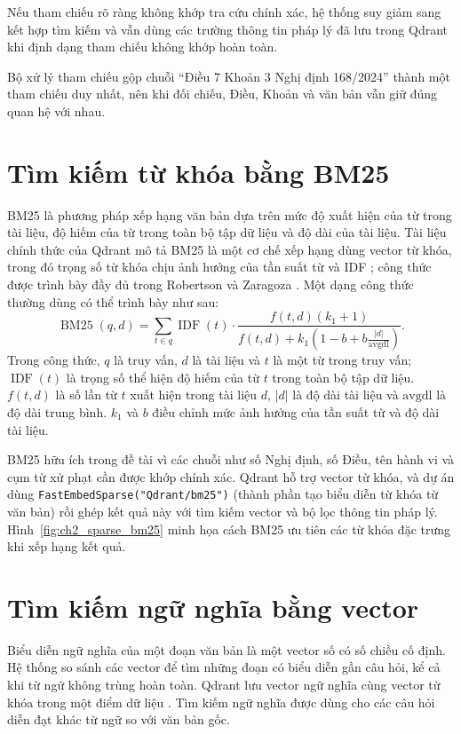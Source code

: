 \documentclass[12pt,a4paper,oneside]{report}
\begin{document}
Nếu tham chiếu rõ ràng không khớp tra cứu chính xác, hệ thống suy giảm sang kết hợp tìm kiếm và vẫn dùng các trường thông tin pháp lý đã lưu trong Qdrant khi định dạng tham chiếu không khớp hoàn toàn.

Bộ xử lý tham chiếu gộp chuỗi ``Điều 7 Khoản 3 Nghị định 168/2024'' thành một tham chiếu duy nhất, nên khi đối chiếu, Điều, Khoản và văn bản vẫn giữ đúng quan hệ với nhau.


\section{Tìm kiếm từ khóa bằng BM25}
BM25 là phương pháp xếp hạng văn bản dựa trên mức độ xuất hiện của từ trong tài liệu, độ hiếm của từ trong toàn bộ tập dữ liệu và độ dài của tài liệu. Tài liệu chính thức của Qdrant mô tả BM25 là một cơ chế xếp hạng dùng vector từ khóa, trong đó trọng số từ khóa chịu ảnh hưởng của tần suất từ và IDF \cite{qdrant_bm25_docs}; công thức được trình bày đầy đủ trong Robertson và Zaragoza \cite{bm25_robertson_2009}. Một dạng công thức thường dùng có thể trình bày như sau:
\begin{equation}
  \operatorname{BM25}(q,d)=\sum_{t\in q}\operatorname{IDF}(t)\cdot
  \frac{f(t,d)(k_1+1)}{f(t,d)+k_1\left(1-b+b\frac{|d|}{\mathrm{avgdl}}\right)}.
\end{equation}
Trong công thức, $q$ là truy vấn, $d$ là tài liệu và $t$ là một từ trong truy vấn; $\operatorname{IDF}(t)$ là trọng số thể hiện độ hiếm của từ $t$ trong toàn bộ tập dữ liệu. $f(t,d)$ là số lần từ $t$ xuất hiện trong tài liệu $d$, $|d|$ là độ dài tài liệu và $\mathrm{avgdl}$ là độ dài trung bình. $k_1$ và $b$ điều chỉnh mức ảnh hưởng của tần suất từ và độ dài tài liệu.

BM25 hữu ích trong đề tài vì các chuỗi như số Nghị định, số Điều, tên hành vi và cụm từ xử phạt cần được khớp chính xác. Qdrant hỗ trợ vector từ khóa, và dự án dùng \texttt{FastEmbedSparse("Qdrant/bm25")} (thành phần tạo biểu diễn từ khóa từ văn bản) rồi ghép kết quả này với tìm kiếm vector và bộ lọc thông tin pháp lý.
Hình~\ref{fig:ch2_sparse_bm25} minh họa cách BM25 ưu tiên các từ khóa đặc trưng khi xếp hạng kết quả.

\section{Tìm kiếm ngữ nghĩa bằng vector}
Biểu diễn ngữ nghĩa của một đoạn văn bản là một vector số có số chiều cố định. Hệ thống so sánh các vector để tìm những đoạn có biểu diễn gần câu hỏi, kể cả khi từ ngữ không trùng hoàn toàn. Qdrant lưu vector ngữ nghĩa cùng vector từ khóa trong một điểm dữ liệu \cite{qdrant_vectors_docs}. Tìm kiếm ngữ nghĩa được dùng cho các câu hỏi diễn đạt khác từ ngữ so với văn bản gốc.
\end{document}
